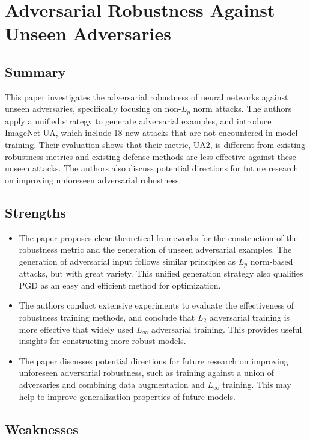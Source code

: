 \documentclass[10pt]{article}
\begin{document}
\newpage
\section{Adversarial Robustness Against Unseen Adversaries}

\subsection{Summary}

This paper investigates the adversarial robustness of neural networks against unseen adversaries, specifically focusing on non-$L_p$ norm attacks. The authors apply a unified strategy to generate adversarial examples, and introduce ImageNet-UA, which include 18 new attacks that are not encountered in model training. Their evaluation shows that their metric, UA2, is different from existing robustness metrics and existing defense methods are less effective against these unseen attacks. The authors also discuss potential directions for future research on improving unforeseen adversarial robustness.

\subsection{Strengths}

\begin{itemize}
    \item The paper proposes clear theoretical frameworks for the construction of the robustness metric and the generation of unseen adversarial examples. The generation of adversarial input follows similar principles as $L_p$ norm-based attacks, but with great variety. This unified generation strategy also qualifies PGD as an easy and efficient method for optimization. 
    \item The authors conduct extensive experiments to evaluate the effectiveness of robustness training methods, and conclude that $L_2$ adversarial training is more effective that widely used $L_\infty$ adversarial training. This provides useful insights for constructing more robust models.
    \item The paper discusses potential directions for future research on improving unforeseen adversarial robustness, such as training against a union of adversaries and combining data augmentation and $L_\infty$ training. This may help to improve generalization properties of future models.  
\end{itemize}

\subsection{Weaknesses}
\end{document}
